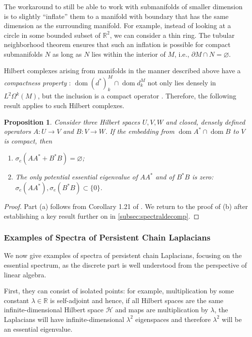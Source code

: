 \documentclass[11pt]{article}
\newtheorem{prop}[theorem]{Proposition}
\theoremstyle{definition}
\theoremstyle{remark}
\DeclareMathOperator\dom{dom}
\newcommand{\Hh}{\mathcal{H}}
\newcommand{\R}{\mathbb{R}}
\begin{document}
The workaround to still be able to work with submanifolds of smaller dimension is to slightly ``inflate'' them to a manifold with boundary that has the same dimension as the surrounding manifold. For example, instead of looking at a circle in some bounded subset of $\R^2$, we can consider a thin ring. The tubular neighborhood theorem \citep[see][p.~346]{spivak} ensures that such an inflation is possible for compact submanifolds $N$ as long as $N$ lies within the interior of $M$, i.e., $\partial M \cap N = \varnothing$.

Hilbert complexes arising from manifolds in the manner described above have a \emph{compactness property} \citep{finderham}: $\dom(d^*)^M_k \cap \dom d_k^M$ not only lies densely in $L^2 \Omega^k(M)$, but the inclusion is a compact operator \citep[see][\S4.2]{finderham}. Therefore, the following result applies to such Hilbert complexes.

\begin{prop}\label{prop:compact embedding}
    Consider three Hilbert spaces $U,V,W$ and closed, densely defined operators $A:U \rightarrow V$ and $B:V \rightarrow W$. If the embedding from $\dom A^*\cap \dom B$ to $V$ is compact, then
    \begin{enumerate}
        \item[(a)] $\sigma_e(AA^*+B^*B)=\varnothing$;
        \item[(b)] The only potential essential eigenvalue of $AA^*$ and of $B^*B$ is zero: $\sigma_e(AA^*), \sigma_e(B^*B) \subset \{0\}$.
    \end{enumerate}
\end{prop}
\begin{proof}
    Part (a) follows from Corollary 1.21 of \citet{schroedingerop}. We return to the proof of (b) after establishing a key result further on in \cref{subsec:spectraldecomp}.
\end{proof}

\subsubsection{Examples of Spectra of Persistent Chain Laplacians} 

We now give examples of spectra of persistent chain Laplacians, focusing on the essential spectrum, as the discrete part is well understood from the perspective of linear algebra.

First, they can consist of isolated points: for example, multiplication by some constant $\lambda \in \R$ is self-adjoint and hence, if all Hilbert spaces are the same infinite-dimensional Hilbert space $\Hh$ and maps are multiplication by $\lambda$, the Laplacians will have infinite-dimensional $\lambda^2$ eigenspaces and therefore $\lambda^2$ will be an essential eigenvalue.
\end{document}
